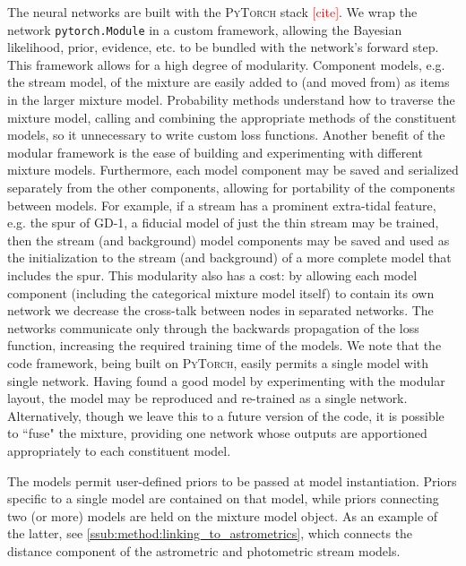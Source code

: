 \documentclass[twocolumn]{aastex631}
\newcommand{\code}[1]{\textsc{#1}}
\newcommand{\package}[1]{\code{#1}}
\newcommand{\stream}[1]{#1}
\newcommand{\TODO}[1]{{\textcolor{red}{#1}}}
\begin{document}
        The neural networks are built with the \package{PyTorch} stack
        \TODO{[cite]}. We wrap the network \texttt{pytorch.Module} in a custom
        framework, allowing the Bayesian likelihood, prior, evidence, etc. to be
        bundled with the network's forward step. This framework allows for a
        high degree of modularity. Component models, e.g. the stream model, of
        the mixture are easily added to (and moved from) as items in the larger
        mixture model. Probability methods understand how to traverse the
        mixture model, calling and combining the appropriate methods of the
        constituent models, so it unnecessary to write custom loss functions.
        Another benefit of the modular framework is the ease of building and
        experimenting with different mixture models. Furthermore, each model
        component may be saved and serialized separately from the other
        components, allowing for portability of the components between models.
        For example, if a stream has a prominent extra-tidal feature, e.g. the
        spur of \stream{GD-1}, a fiducial model of just the thin stream may be
        trained, then the stream (and background) model components may be saved
        and used as the initialization to the stream (and background) of a more
        complete model that includes the spur. This modularity also has a cost:
        by allowing each model component (including the categorical mixture
        model itself) to contain its own network we decrease the cross-talk
        between nodes in separated networks. The networks communicate only
        through the backwards propagation of the loss function, increasing the
        required training time of the models. We note that the code framework,
        being built on \package{PyTorch}, easily permits a single model with
        single network. Having found a good model by experimenting with the
        modular layout, the model may be reproduced and re-trained as a single
        network. Alternatively, though we leave this to a future version of the
        code, it is possible to ``fuse" the mixture, providing one network whose
        outputs are apportioned appropriately to each constituent model.

        The models permit user-defined priors to be passed at model
        instantiation.  Priors specific to a single model are contained on that
        model, while priors connecting two (or more) models are held on the
        mixture model object. As an example of the latter, see
        \autoref{ssub:method:linking_to_astrometrics}, which connects the
        distance component of the astrometric and photometric stream models.
\end{document}
